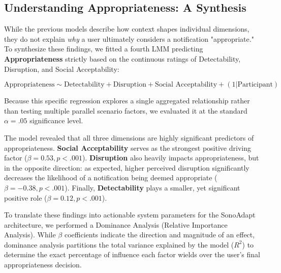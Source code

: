 \subsection{Understanding Appropriateness: A Synthesis}
\label{sec:res_appropriateness}

While the previous models describe how context shapes individual dimensions, they do not explain \textit{why} a user ultimately considers a notification "appropriate." To synthesize these findings, we fitted a fourth LMM predicting \textbf{Appropriateness} strictly based on the continuous ratings of Detectability, Disruption, and Social Acceptability:

$$ \text{Appropriateness} \sim \text{Detectability} + \text{Disruption} + \text{Social Acceptability} + (1 | \text{Participant}) $$

Because this specific regression explores a single aggregated relationship rather than testing multiple parallel scenario factors, we evaluated it at the standard $\alpha = .05$ significance level.

The model revealed that all three dimensions are highly significant predictors of appropriateness. \textbf{Social Acceptability} serves as the strongest positive driving factor ($\beta = 0.53, p < .001$). \textbf{Disruption} also heavily impacts appropriateness, but in the opposite direction: as expected, higher perceived disruption significantly decreases the likelihood of a notification being deemed appropriate ($\beta = -0.38, p < .001$). Finally, \textbf{Detectability} plays a smaller, yet significant positive role ($\beta = 0.12, p < .001$).

To translate these findings into actionable system parameters for the SonoAdapt architecture, we performed a Dominance Analysis (Relative Importance Analysis). While $\beta$ coefficients indicate the direction and magnitude of an effect, dominance analysis partitions the total variance explained by the model ($R^2$) to determine the exact percentage of influence each factor wields over the user's final appropriateness decision.

